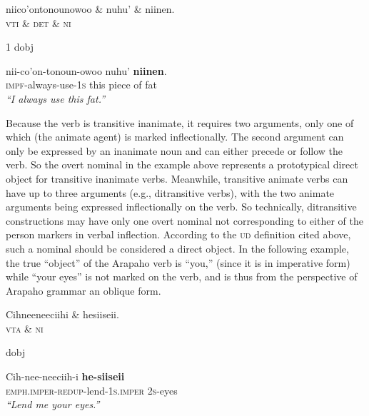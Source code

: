 \documentclass[11pt]{article}
\begin{document}
\small
\begin{exe}
\ex \label{objct} %
\begin{dependency}
\begin{deptext}
niico'ontonounowoo \& nuhu' \& niinen.\\
\textsc{vti} \& \textsc{det} \& \textsc{ni}\\
\end{deptext}
	{1}	{dobj}
\end{dependency}
\gll nii-co'on-tonoun-owoo nuhu' \textbf{niinen}.\\
{\textsc{impf}-always-use-\textsc{1s}} this {piece of fat}\\
\trans \textit{``I always use this fat.''}
\end{exe}
\normalsize
Because the verb is transitive inanimate, it requires two arguments, only one of which (the animate agent) is marked inflectionally. The second argument can only be expressed by an inanimate noun and can either precede or follow the verb. So the overt nominal in the example above represents a prototypical direct object for transitive inanimate verbs. Meanwhile, transitive animate verbs can have up to three arguments (e.g., ditransitive verbs), with the two animate arguments being expressed inflectionally on the verb. So technically, ditransitive constructions may have only one overt nominal not corresponding to either of the person markers in verbal inflection. According to the \textsc{ud} definition cited above, such a nominal should be considered a direct object. In the following example, the true ``object'' of the Arapaho verb is ``you,'' (since it is in imperative form) while ``your eyes'' is not marked on the verb, and is thus from the perspective of Arapaho grammar an oblique form. 

\small
\begin{exe}
\ex \label{objse} %
\begin{dependency}
\begin{deptext}
Cihneeneeciihi \& hesiiseii.\\
\textsc{vta} \& \textsc{ni} \\
\end{deptext}
	{dobj}
\end{dependency}
\gll Cih-nee-neeciih-i \textbf{he-siiseii}\\
{\textsc{emph.imper-redup}-lend-\textsc{1s.imper}} {\textsc{2s}-eyes}\\
\trans \textit{``Lend me your eyes.''}
\end{exe}
\end{document}
